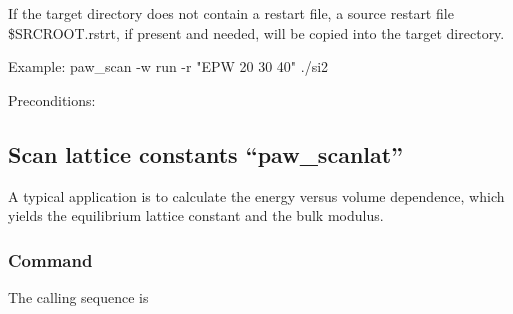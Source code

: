 \documentclass[final,12pt]{article}
\begin{document}
{{{{{{{\begin{minipage}{0.9\linewidth}
 If the target directory does not contain a restart file,
 a source restart file \$SRCROOT.rstrt, if present and needed,
 will be copied into the target directory.

 Example:
 	 paw\_scan -w run -r "EPW 20 30 40" ./si2
\end{minipage}}

\bigskip
\noindent Preconditions:\\[2mm]
\hspace*{1cm}
\bigskip
%
\subsection{Scan lattice constants ``paw\_scanlat''}
A typical application is to calculate the energy versus volume
dependence, which yields the equilibrium lattice constant and the bulk
modulus. 

\subsubsection{Command}
The calling sequence is

\bigskip{}
\vspace{0.5cm}

}}}}}}
\end{document}
